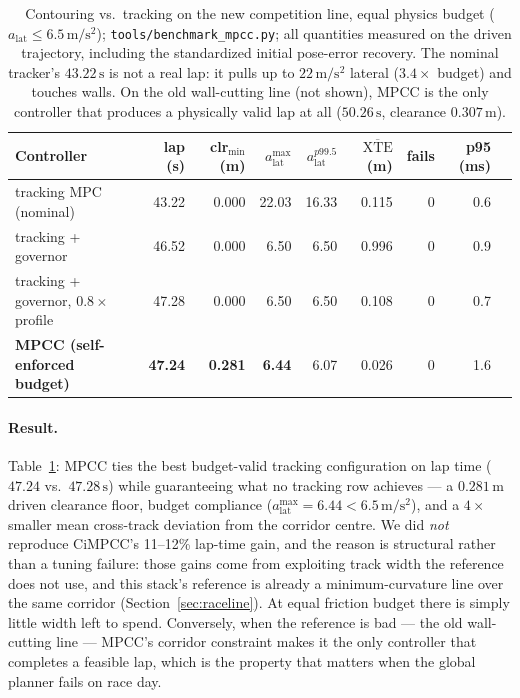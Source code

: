 \documentclass[11pt]{article}
\begin{document}
\begin{table}[t]
  \centering
  \small
  \begin{tabular}{@{}l rrrrr r rr@{}}
    \toprule
    Controller & lap (s) & clr$_{\min}$ (m) & $a_{\mathrm{lat}}^{\max}$
    & $a_{\mathrm{lat}}^{p99.5}$ & $\overline{\mathrm{XTE}}$ (m)
    & fails & p95 (ms) \\
    \midrule
    tracking MPC (nominal) & 43.22 & 0.000 & 22.03 & 16.33 & 0.115 & 0 & 0.6 \\
    tracking + governor & 46.52 & 0.000 & 6.50 & 6.50 & 0.996 & 0 & 0.9 \\
    tracking + governor, $0.8\times$ profile & 47.28 & 0.000 & 6.50 & 6.50 & 0.108 & 0 & 0.7 \\
    \textbf{MPCC (self-enforced budget)} & \textbf{47.24} & \textbf{0.281} & \textbf{6.44} & 6.07 & 0.026 & 0 & 1.6 \\
    \bottomrule
  \end{tabular}
  \caption{Contouring vs.\ tracking on the new competition line, equal
  physics budget ($a_{\mathrm{lat}} \le 6.5\,\mathrm{m/s^2}$);
  \texttt{tools/benchmark\_mpcc.py}; all quantities measured on the
  driven trajectory, including the standardized initial pose-error
  recovery.  The nominal tracker's $43.22\,\mathrm{s}$ is not a real
  lap: it pulls up to $22\,\mathrm{m/s^2}$ lateral ($3.4\times$ budget)
  and touches walls.  On the old wall-cutting line (not shown), MPCC is
  the only controller that produces a physically valid lap at all
  ($50.26\,\mathrm{s}$, clearance $0.307\,\mathrm{m}$).}
  \label{tab:mpcc}
\end{table}

\paragraph{Result.}
Table~\ref{tab:mpcc}: MPCC ties the best budget-valid tracking
configuration on lap time ($47.24$ vs.\ $47.28\,\mathrm{s}$) while
guaranteeing what no tracking row achieves --- a $0.281\,\mathrm{m}$
driven clearance floor, budget compliance
($a_{\mathrm{lat}}^{\max} = 6.44 < 6.5\,\mathrm{m/s^2}$), and a
$4\times$ smaller mean cross-track deviation from the corridor centre.
We did \emph{not} reproduce CiMPCC's 11--12\% lap-time gain, and the
reason is structural rather than a tuning failure: those gains come
from exploiting track width the reference does not use, and this
stack's reference is already a minimum-curvature line over the same
corridor (Section~\ref{sec:raceline}).  At equal friction budget there
is simply little width left to spend.  Conversely, when the reference
is bad --- the old wall-cutting line --- MPCC's corridor constraint
makes it the only controller that completes a feasible lap, which is
the property that matters when the global planner fails on race day.
\end{document}

